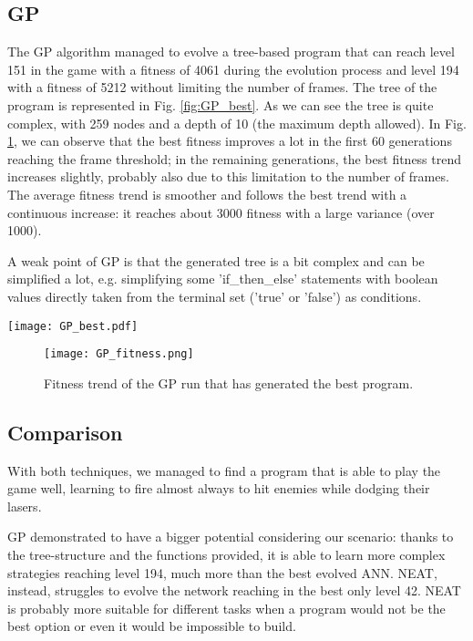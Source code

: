 \subsection{GP}
The GP algorithm managed to evolve a tree-based program that can reach level 151 in the
game with a fitness of 4061 during the evolution process and level 194 with a fitness of 5212
without limiting the number of frames. The tree of the program is represented in Fig. \ref{fig:GP_best}. As
we can see the tree is quite complex, with 259 nodes and a depth of 10 (the maximum depth
allowed). In Fig. \ref{fig:GP_fitness}, we can observe that the best fitness improves a lot in the first 60
generations reaching the frame threshold; in the remaining generations, the best fitness
trend increases slightly, probably also due to this limitation to the number of frames. The
average fitness trend is smoother and follows the best trend with a continuous increase: it
reaches about 3000 fitness with a large variance (over 1000).

A weak point of GP is that the generated tree is a bit complex and can be simplified a lot,
e.g. simplifying some 'if\_then\_else' statements with boolean values directly taken from the
terminal set ('true' or 'false') as conditions.

\begin{figure*}[htbp]
\centerline{\texttt{[image: GP\_best.pdf]}}
\caption{Best tree-based program generated by GP.}
\label{fig:GP_best}
\end{figure*}

\begin{figure}[htbp]
\centerline{\texttt{[image: GP\_fitness.png]}}
\caption{Fitness trend of the GP run that has generated the best program.}
\label{fig:GP_fitness}
\end{figure}



\subsection{Comparison}
With both techniques, we managed to find a program that is able to play the game well,
learning to fire almost always to hit enemies while dodging their lasers.

GP demonstrated to have a bigger potential considering our scenario: thanks to the
tree-structure and the functions provided, it is able to learn more complex strategies
reaching level 194, much more than the best evolved ANN. NEAT, instead, struggles to
evolve the network reaching in the best only level 42. NEAT is probably more suitable for
different tasks when a program would not be the best option or even it would be impossible
to build.

